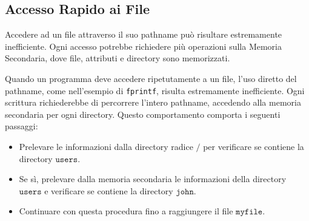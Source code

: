 
\subsection{Accesso Rapido ai File}
Accedere ad un file attraverso il suo pathname può risultare estremamente inefficiente. Ogni accesso potrebbe richiedere più operazioni sulla Memoria Secondaria, dove file, attributi e directory sono memorizzati.



Quando un programma deve accedere ripetutamente a un file, l'uso diretto del pathname, come nell'esempio di \texttt{fprintf}, risulta estremamente inefficiente. Ogni scrittura richiederebbe di percorrere l'intero pathname, accedendo alla memoria secondaria per ogni directory. Questo comportamento comporta i seguenti passaggi:
\begin{itemize}
    \item Prelevare le informazioni dalla directory radice \(\texttt{/}\) per verificare se contiene la directory \(\texttt{users}\).
    \item Se sì, prelevare dalla memoria secondaria le informazioni della directory \(\texttt{users}\) e verificare se contiene la directory \(\texttt{john}\).
    \item Continuare con questa procedura fino a raggiungere il file \(\texttt{myfile}\).
\end{itemize}


